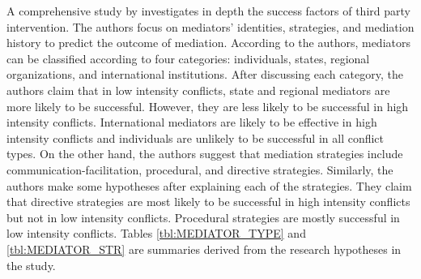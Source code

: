 \documentclass[letterpaper,12pt,titlepage,oneside,final]{book}
\begin{document}
A comprehensive study by \citet{bercovitch2006} investigates in depth the success factors of third party intervention. The authors focus on mediators' identities, strategies, and mediation history to predict the outcome of mediation. According to the authors, mediators can be classified according to four categories: individuals, states, regional organizations, and international institutions. After discussing each category, the authors claim that in low intensity conflicts, state and regional mediators are more likely to be successful. However, they are less likely to be successful in high intensity conflicts. International mediators are likely to be effective in high intensity conflicts and individuals are unlikely to be successful in all conflict types.
On the other hand, the authors suggest that mediation strategies include communication-facilitation, procedural, and directive strategies. Similarly, the authors make some hypotheses after explaining each of the strategies. They claim that directive strategies are most likely to be successful in high intensity conflicts but not in low intensity conflicts. Procedural strategies are mostly successful in low intensity conflicts. Tables \ref{tbl:MEDIATOR_TYPE} and \ref{tbl:MEDIATOR_STR} are summaries derived from the research hypotheses in the study. 
\end{document}
